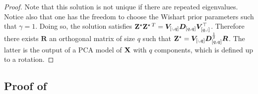 \begin{proof}
Note that this solution is not unique if there are repeated eigenvalues. Notice also that one has the freedom to choose the Wishart prior parameters such that $\gamma=1$. Doing so, the solution satisfies $\mathbf{Z}^\star \mathbf{Z}^{\star \:T} = \bm{V}_{[:,q]} \bm{D}_{[q,q]} \bm{V}^\top_{[q,:]}$. Therefore there exists $\bm{R}$ an orthogonal matrix of size $q$ such that $\mathbf{Z}^{\star} = \bm{V}_{[:,q]}\bm{D}_{[q,q]}^{\frac{1}{2}}\bm{R}$. The latter is the output of a PCA model of $\mathbf{X}$ with $q$ components, which is defined up to a rotation.
\end{proof}

\subsection{Proof of } \label{proof:lambda_perp_integrability}

\integrabilitypairwiseMRF*

